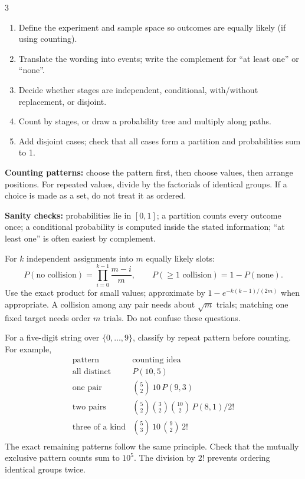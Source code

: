 \documentclass[10pt]{article}
\newcommand{\boxstart}[1]{\begin{tcolorbox}[title={#1},sharp corners]}
\newcommand{\boxend}{\end{tcolorbox}}
\begin{document}
\small

\begin{multicols*}{3}
	\vspace*{-1em}

	\boxstart{L1 — How to attack a probability question}
	\begin{enumerate}
		\item Define the experiment and sample space so outcomes are equally likely (if using counting).
		\item Translate the wording into events; write the complement for ``at least one'' or ``none''.
		\item Decide whether stages are independent, conditional, with/without replacement, or disjoint.
		\item Count by stages, or draw a probability tree and multiply along paths.
		\item Add disjoint cases; check that all cases form a partition and probabilities sum to 1.
	\end{enumerate}
	\textbf{Counting patterns:} choose the pattern first, then choose values, then arrange positions. For repeated values, divide by the factorials of identical groups. If a choice is made as a set, do not treat it as ordered.

	\smallskip
	\textbf{Sanity checks:} probabilities lie in $[0,1]$; a partition counts every outcome once; a conditional probability is computed inside the stated information; ``at least one'' is often easiest by complement.
	\boxend

	\boxstart{L1 — Collision / birthday workflow}
	For $k$ independent assignments into $m$ equally likely slots:
	\[
		P(\text{no collision})=\prod_{i=0}^{k-1}\frac{m-i}{m},
		\qquad P(\ge1\text{ collision})=1-P(\text{none}).
	\]
	Use the exact product for small values; approximate by $1-e^{-k(k-1)/(2m)}$ when appropriate. A collision among any pair needs about $\sqrt m$ trials; matching one fixed target needs order $m$ trials. Do not confuse these questions.
	\boxend

	\boxstart{L1 — Lecture pattern: counting a partition}
	For a five-digit string over $\{0,\ldots,9\}$, classify by repeat pattern before counting. For example,
	\[
		\begin{array}{c|c}
			\text{pattern}         & \text{counting idea}                     \\ \hline
			\text{all distinct}    & P(10,5)                                  \\
			\text{one pair}        & \binom52\,10\,P(9,3)                     \\
			\text{two pairs}       & \binom52\binom32\binom{10}{2}\,P(8,1)/2! \\
			\text{three of a kind} & \binom53\,10\,\binom92\,2!               \\
		\end{array}
	\]
	The exact remaining patterns follow the same principle. Check that the mutually exclusive pattern counts sum to $10^5$. The division by $2!$ prevents ordering identical groups twice.
	\boxend


\end{multicols*}
\end{document}

